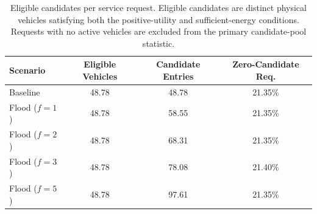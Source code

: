 \begin{table}[t]
\centering
\caption{Eligible candidates per service request. Eligible candidates are distinct physical vehicles satisfying both the positive-utility and sufficient-energy conditions. Requests with no active vehicles are excluded from the primary candidate-pool statistic.}
\label{tab:eligible_candidates}
\begin{tabular}{lccc}
\hline
Scenario & Eligible Vehicles & Candidate Entries & Zero-Candidate Req. \\
\hline
Baseline & 48.78 & 48.78 & 21.35\% \\
Flood ($f=1$) & 48.78 & 58.55 & 21.35\% \\
Flood ($f=2$) & 48.78 & 68.31 & 21.35\% \\
Flood ($f=3$) & 48.78 & 78.08 & 21.40\% \\
Flood ($f=5$) & 48.78 & 97.61 & 21.35\% \\
\hline
\end{tabular}
\end{table}